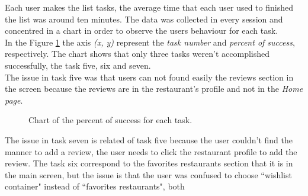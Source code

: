 Each user makes the list tasks, the average time that each user used
to finished the list was around ten minutes. The data was collected in
every session and concentred in a chart in order to observe the users
behaviour for each task. \\ In the Figure  \ref{fig:tsuccess} the axis 
\textit{(x, y)} represent the \textit{task number} and \textit{percent 
of success},  respectively. The chart shows that only
three tasks weren't accomplished successfully, the task five, six and seven. \\ 
The issue in task five was that users can not found easily the reviews
section in the screen because the reviews are in the restaurant's
profile and not in the \textit{Home page}. 
\begin{figure}
\centering
\captionsetup{font=footnotesize}
\caption{Chart of the percent of success for each task.}
\label{fig:tsuccess}   
\end{figure}
The issue in task seven is related of
task five because the user couldn't find the manner to add a review, the
user needs to click the restaurant profile to add the review. The task
six correspond to the favorites restaurants section that it is in the
main screen, but the issue is that the user was confused to choose
``wishlist container" instead  of  ``favorites restaurants", both 
